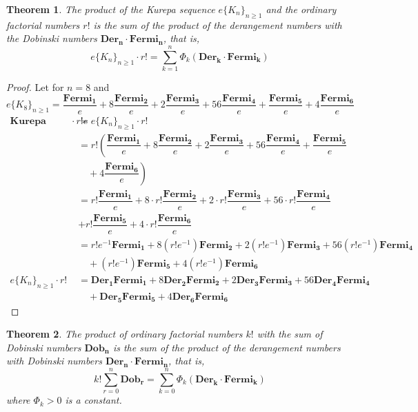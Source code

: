 \documentclass[pdflatex,sn-mathphys-num]{sn-jnl}%
\newtheorem{theorem}{Theorem}
\theoremstyle{thmstyleone}%
\theoremstyle{thmstyletwo}%
\theoremstyle{thmstylethree}%
\begin{document}
\begin{theorem}
    The product of the Kurepa sequence $ e\lbrace K_n\rbrace_{n\geq 1}$ and the ordinary factorial numbers $r!$ is the sum of the product of the derangement numbers with the Dobinski numbers $\mathbf{Der_n \cdotp Fermi_n}$, that is, 
    $$ e\lbrace K_n\rbrace_{n\geq 1} \cdotp r! = \sum_{k=1}^{n}\Phi_k (\mathbf{Der_k \cdotp Fermi_k})$$
\end{theorem}
\begin{proof}Let for $n=8$ and  $$e\lbrace K_8\rbrace_{n\geq 1} = \dfrac{\mathbf{Fermi_1} }{e} + 8\dfrac{\mathbf{Fermi_2}}{e} +2\dfrac{\mathbf{Fermi_3}}{e}+ 56\dfrac{\mathbf{Fermi_4}}{e}+ \dfrac{\mathbf{Fermi_5}}{e}+ 4\dfrac{\mathbf{Fermi_6}}{e}$$
\begin{align*}
      \textbf{Kurepa sequence} \cdotp r!e&=  e\lbrace K_n\rbrace_{n\geq 1} \cdotp r! \\
      &=r! \left(  \dfrac{\mathbf{Fermi_1} }{e} + 8\dfrac{\mathbf{Fermi_2}}{e} +2\dfrac{\mathbf{Fermi_3}}{e}+ 56\dfrac{\mathbf{Fermi_4}}{e}+ \dfrac{\mathbf{Fermi_5}}{e} \right. \\
     &\left.  \quad + 4\dfrac{\mathbf{Fermi_6}}{e}\right) \\
   &=  r!\dfrac{\mathbf{Fermi_1} }{e} + 8\cdotp r!\dfrac{\mathbf{Fermi_2}}{e} +2\cdotp r!\dfrac{\mathbf{Fermi_3}}{e}+ 56\cdotp r!\dfrac{\mathbf{Fermi_4}}{e}\\
   &+r!\dfrac{\mathbf{Fermi_5}}{e}+ 4\cdotp r!\dfrac{\mathbf{Fermi_6}}{e}\\
   &= r!e^{-1}\mathbf{Fermi_1} + 8(r!e^{-1})\mathbf{Fermi_2} + 2(r!e^{-1})\mathbf{Fermi_3} + 56(r!e^{-1})\mathbf{Fermi_4} \\
  & \quad + (r!e^{-1})\mathbf{Fermi_5}+ 4(r!e^{-1})\mathbf{Fermi_6}\\
   e\lbrace K_n\rbrace_{n\geq 1} \cdotp r! &= \mathbf{Der_1} \mathbf{Fermi_1} + 8\mathbf{Der_2} \mathbf{Fermi_2} + 2 \mathbf{Der_3} \mathbf{Fermi_3} +56 \mathbf{Der_4} \mathbf{Fermi_4} \\ 
  &\quad+ \mathbf{Der_5} \mathbf{Fermi_5}+ 4 \mathbf{Der_6} \mathbf{Fermi_6}
\end{align*}
\end{proof}    


\begin{theorem}
    The product of ordinary factorial numbers $k!$ with the sum of Dobinski numbers $\mathbf{Dob_n}$ is the sum of the product of the derangement numbers with Dobinski numbers $\mathbf{Der_n \cdotp Fermi_n}$, that is,
    $$ k!\sum_{r=0}^n   \mathbf{Dob_r}=  \sum_{k=0}^n \Phi_k (\mathbf{Der_k \cdotp Fermi_k})$$
    where $\Phi_k>0$ is a constant.
\end{theorem}
\end{document}
